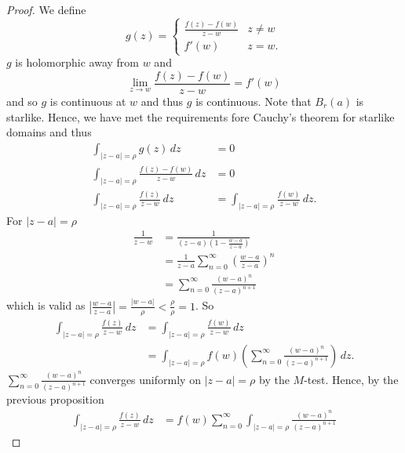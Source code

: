 \begin{proof}
    We define
    \[
        g(z) =
        \begin{cases}
            \frac{f(z) - f(w)}{z - w} & z \neq w \\
            f'(w) & z = w.
        \end{cases}
    \]
    $g$ is holomorphic away from $w$ and
    \[
        \lim_{z \to w} \frac{f(z) - f(w)}{z - w} = f'(w)
    \]
    and so $g$ is continuous at $w$ and thus $g$ is continuous.
    Note that $B_r(a)$ is starlike.
    Hence, we have met the requirements fore Cauchy's theorem for
    starlike domains and thus
    \begin{align*}
        \int_{\lvert z - a \rvert = \rho} g(z) \,dz &= 0 \\
        \int_{\lvert z - a \rvert = \rho}
            \frac{f(z) - f(w)}{z - w} \,dz &= 0 \\
        \int_{\lvert z - a \rvert = \rho} \frac{f(z)}{z - w} \,dz
        &= \int_{\lvert z - a \rvert = \rho} \frac{f(w)}{z - w} \,dz.
    \end{align*}
    For $\lvert z - a \rvert = \rho$
    \begin{align*}
        \frac1{z - w} 
        &= \frac1{(z-a)\left(1 - \frac{w-a}{z-a}\right)} \\
        &= \frac1{z-a} \sum_{n=0}^\infty 
        \left(
            \frac{w-a}{z-a}
        \right)^n \\
        &= \sum_{n = 0}^\infty \frac{(w - a)^n}{(z - a)^{n + 1}}
    \end{align*}
    which is valid as 
    $\left\lvert \frac{w-a}{z-a} \right\rvert 
    = \frac{\lvert w - a \rvert}{\rho} < \frac{\rho}{\rho} = 1$.
    So
    \begin{align*}
        \int_{\lvert z - a \rvert = \rho} \frac{f(z)}{z - w} \,dz
        &= \int_{\lvert z - a \rvert = \rho} \frac{f(w)}{z - w} \,dz \\
        &= \int_{\lvert z - a \rvert = \rho} f(w) 
        \left(
            \sum_{n = 0}^\infty \frac{(w - a)^n}{(z - a)^{n + 1}}
        \right)
        \,dz.
    \end{align*}
    $\sum_{n = 0}^\infty \frac{(w - a)^n}{(z - a)^{n + 1}}$ converges
    uniformly on $\lvert z - a \rvert = \rho$ by the $M$-test.
    Hence, by the previous proposition
    \begin{align*}
        \int_{\lvert z - a \rvert = \rho} \frac{f(z)}{z - w} \,dz
        &= f(w) \sum_{n = 0}^\infty 
            \int_{\lvert z - a \rvert = \rho} 
            \frac{(w - a)^n}{(z - a)^{n + 1}}

\end{align*}
\end{proof}

